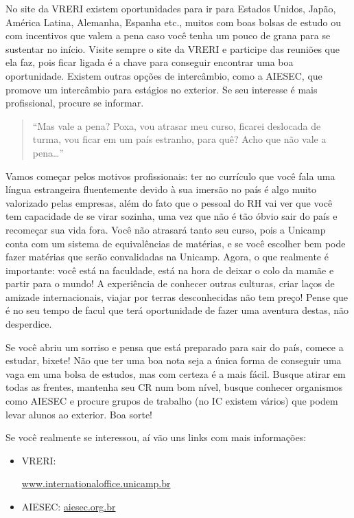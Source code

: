No site da VRERI existem oportunidades para ir para Estados Unidos, Japão,
América Latina, Alemanha, Espanha etc., muitos com boas bolsas de estudo ou com
incentivos que valem a pena caso você tenha um pouco de grana para se sustentar
no início. Visite sempre o site da VRERI e participe das reuniões que ela faz,
pois ficar ligada é a chave para conseguir encontrar uma boa oportunidade.
Existem outras opções de intercâmbio, como a AIESEC, que promove um intercâmbio
para estágios no exterior. Se seu interesse é mais profissional, procure se
informar.

\begin{quote}
``Mas vale a pena? Poxa, vou atrasar meu curso, ficarei deslocada de turma, vou
ficar em um país estranho, para quê? Acho que não vale a pena{\dots}''
\end{quote}

Vamos começar pelos motivos profissionais: ter no currículo que você fala uma
língua estrangeira fluentemente devido à sua imersão no país é algo muito
valorizado pelas empresas, além do fato que o pessoal do RH vai ver que você
tem capacidade de se virar sozinha, uma vez que não é tão óbvio sair do país e
recomeçar sua vida fora. Você não atrasará tanto seu curso, pois a Unicamp
conta com um sistema de equivalências de matérias, e se você escolher bem pode
fazer matérias que serão convalidadas na Unicamp. Agora, o que realmente é
importante: você está na faculdade, está na hora de deixar o colo da mamãe e
partir para o mundo! A experiência de conhecer outras culturas, criar laços de
amizade internacionais, viajar por terras desconhecidas não tem preço! Pense
que é no seu tempo de facul que terá oportunidade de fazer uma aventura destas,
não desperdice.

Se você abriu um sorriso e pensa que está preparado para sair do país, comece a
estudar, bixete! Não que ter uma boa nota seja a única forma de conseguir uma
vaga em uma bolsa de estudos, mas com certeza é a mais fácil. Busque atirar em
todas as frentes, mantenha seu CR num bom nível, busque conhecer organismos
como AIESEC e procure grupos de trabalho (no IC existem vários) que podem levar
alunos ao exterior. Boa sorte!

Se você realmente se interessou, aí vão uns links com mais informações:

\begin{itemize}
\item VRERI:
  \begin{small}
  \url{www.internationaloffice.unicamp.br}
  \end{small}
\item AIESEC: \url{aiesec.org.br}
\end{itemize}

